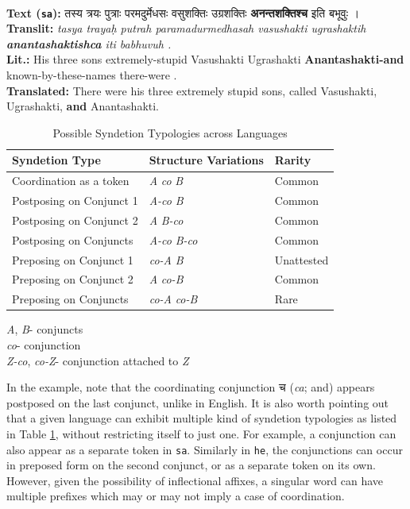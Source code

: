 \begin{example}
\label{examp:conj_sa}
\textbf{ }\\
\textbf{Text (\texttt{sa}):} \texthindi{तस्य त्रयः पुत्राः परमदुर्मेधसः वसुशक्तिः उग्रशक्तिः \textbf{अनन्तशक्तिश्च} इति बभूवुः ।} \\
\textbf{Translit:} \textit{tasya trayaḥ putrah paramadurmedhasah vasushakti ugrashaktih \textbf{anantashaktishca} iti babhuvuh .}\\
\textbf{Lit.:} His three sons extremely-stupid Vasushakti Ugrashakti \textbf{Anantashakti-and} known-by-these-names there-were .\\
\textbf{Translated:} There were his three extremely stupid sons, called Vasushakti, Ugrashakti, \textbf{and} Anantashakti.
\end{example}

\begin{table}[H]
    \centering
    \begin{tabular}{|l|l|l|}
    \hline
    \textbf{Syndetion Type} & \textbf{Structure Variations} & \textbf{Rarity}\\
    \hline
    Coordination as a token & \textit{A} \textit{co} \textit{B} & Common\\
    Postposing on Conjunct 1 & \textit{A-co} \textit{B} & Common\\
    Postposing on Conjunct 2 & \textit{A} \textit{B-co} & Common\\
    Postposing on Conjuncts & \textit{A-co} \textit{B-co} & Common\\
    Preposing on Conjunct 1 & \textit{co-A} \textit{B} & Unattested\\
    Preposing on Conjunct 2 & \textit{A} \textit{co-B} & Common\\
    Preposing on Conjuncts & \textit{co-A} \textit{co-B} & Rare\\
    \hline
    \end{tabular}
    \caption{Possible Syndetion Typologies across Languages}
    \textit{A}, \textit{B}- conjuncts\\
    \textit{co}- conjunction\\
    \textit{Z-co}, \textit{co-Z}- conjunction attached to \textit{Z}\\
    \label{tab:syndetion}
\end{table}

In the example, note that the coordinating conjunction \texthindi{च} (\textit{ca}; and) appears postposed on the last conjunct, unlike in English. It is also worth pointing out that a given language can exhibit multiple kind of syndetion typologies as listed in Table \ref{tab:syndetion}, without restricting itself to just one. For example, a conjunction can also appear as a separate token in \verb|sa|. Similarly in \verb|he|, the conjunctions can occur in preposed form on the second conjunct, or as a separate token on its own. However, given the possibility of inflectional affixes, a singular word can have multiple prefixes which may or may not imply a case of coordination.

